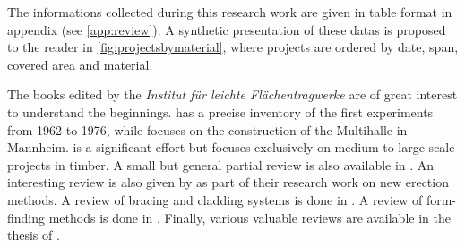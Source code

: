The informations collected during this research work are given in table format in appendix (see \cref{app:review}). A synthetic presentation of these datas is proposed to the reader in \cref{fig:projectsbymaterial}, where projects are ordered by date, span, covered area and material.

The books edited by the \emph{Institut für leichte Flächentragwerke} are of great interest to understand the beginnings.  \cite{IL10} has a precise inventory of the first experiments from 1962 to 1976, while  \cite{IL13} focuses on the construction of the Multihalle in Mannheim.  \cite{Chilton2017} is a significant effort but focuses exclusively on medium to large scale projects in timber. A small but general partial review is also available in \cite{Collins2016}. An interesting review is also given by \citet{Quinn2014} as part of their research work on new erection methods. A review of bracing and cladding systems is done in \cite{Cuvilliers2017}. A review of form-finding methods is done in \cite{Vaulot2016}. Finally, various valuable reviews are available in the thesis of \citet{Douthe2007,Bouhaya2010,Tayeb2015a,Lafuente2015}.


